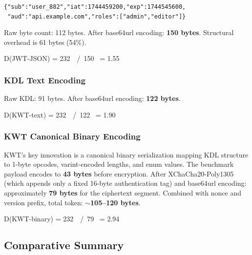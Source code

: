 \documentclass[11pt, letterpaper]{article}
\begin{document}
\begin{lstlisting}[language={}]
{"sub":"user_882","iat":1744459200,"exp":1744545600,
 "aud":"api.example.com","roles":["admin","editor"]}
\end{lstlisting}

Raw byte count: 112 bytes. After base64url encoding: \textbf{150 bytes}.
Structural overhead is 61 bytes (54\%).

\begin{eqbox}
D(JWT-JSON) = 232 \, \,/\, 150 \, = 1.55 \,
\end{eqbox}

\subsubsection{KDL Text Encoding}

Raw KDL: 91 bytes. After base64url encoding: \textbf{122 bytes}.

\begin{eqbox}
D(KWT-text) = 232 \, \,/\, 122 \, = 1.90 \,
\end{eqbox}

\subsubsection{KWT Canonical Binary Encoding}

KWT's key innovation is a canonical binary serialization mapping KDL structure
to 1-byte opcodes, varint-encoded lengths, and enum values. The benchmark
payload encodes to \textbf{43 bytes} before encryption. After
XChaCha20-Poly1305 (which appends only a fixed 16-byte authentication tag)
and base64url encoding: approximately \textbf{79 bytes} for the ciphertext
segment. Combined with nonce and version prefix, total token: $\sim$\textbf{105--120 bytes}.

\begin{eqbox}
D(KWT-binary) = 232 \, \,/\, 79 \, = 2.94 \,
\end{eqbox}

\subsection{Comparative Summary}
\end{document}
